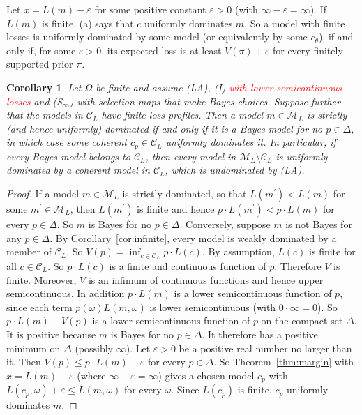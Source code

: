 \documentclass[11pt]{article}
\newtheorem{corollary}[theorem]{Corollary}
\theoremstyle{definition}
\theoremstyle{remark}
\newcommand{\M}{\mathcal M}
\newcommand{\C}{\mathcal C}
\begin{document}
Let $x=L(m)-\varepsilon$ for some positive constant $\varepsilon>0$ (with $\infty-\varepsilon=\infty$). If $L(m)$ is finite, (a) says that $c$ uniformly dominates $m$. So a model with finite losses is uniformly dominated by some model (or equivalently by some $c_\theta$), if and only if, for some $\varepsilon>0$, its expected loss is at least $V(\pi)+\varepsilon$ for every finitely supported prior $\pi$.



\begin{corollary}\label{cor:strict}
Let $\Omega$ be finite and assume (LA), (I) \textcolor{red}{with lower semicontinuous losses} and (S$_\infty$) with selection maps that make Bayes choices.  Suppose further that the models in $\C_L$ have finite loss profiles. Then a model $m\in\M_L$ is strictly (and hence uniformly) dominated if and only if it is a Bayes model for no $p\in\Delta$, in which case some coherent $c_p\in\C_L$ uniformly dominates it. In particular, if every Bayes model belongs to $\C_L$, then every model in $\M_L\setminus\C_L$ is uniformly dominated by a coherent model in $\C_L$, which is undominated by (LA).
\end{corollary}
\begin{proof}
If a model $m\in\M_L$ is strictly dominated, so that $L(m^\prime)<L(m)$ for some $m^\prime\in\M_L$, then $L(m^\prime)$ is finite and hence $p\cdot L(m^\prime)<p\cdot L(m)$ for every $p\in\Delta$. So $m$ is Bayes for no $p\in\Delta$. Conversely, suppose $m$ is not Bayes for any $p\in\Delta$. By Corollary~\ref{cor:infinite}, every model is weakly dominated by a member of $\C_L$. So $V(p)=\inf_{c\in\C_L}p\cdot L(c)$. By assumption, $L(c)$ is finite for all $c\in\C_L$. So $p\cdot L(c)$ is a finite and continuous function of $p$. Therefore $V$ is finite. Moreover, $V$ is an infimum of continuous functions and hence upper semicontinuous. In addition $p\cdot L(m)$ is a lower semicontinuous function of $p$, since each term $p(\omega) L(m,\omega)$ is lower semicontinuous (with $0\cdot\infty=0$). So $p\cdot L(m)-V(p)$ is a lower semicontinuous function of $p$ on the compact set $\Delta$. It is positive because $m$ is Bayes for no $p\in\Delta$. It therefore has a positive minimum on $\Delta$ (possibly $\infty$). Let $\varepsilon>0$ be a positive real number no larger than it. Then $V(p)\le p\cdot L(m)-\varepsilon$ for every $p\in\Delta$. So Theorem~\ref{thm:margin} with $x=L(m)-\varepsilon$ (where $\infty-\varepsilon=\infty$) gives a chosen model $c_p$ with $L(c_p,\omega)+\varepsilon\le L(m,\omega)$ for every $\omega$. Since $L(c_p)$ is finite, $c_p$ uniformly dominates $m$.
\end{proof}
\end{document}
